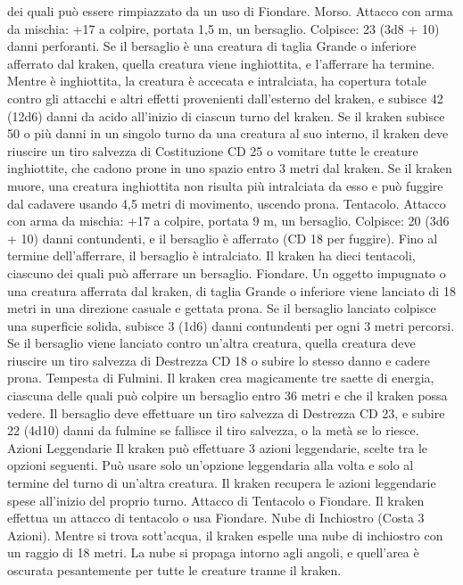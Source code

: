 \begin{multicols}{2}
dei quali può essere rimpiazzato da un uso di Fiondare.
Morso. Attacco con arma da mischia: +17 a colpire, portata 1,5
m, un bersaglio.
Colpisce: 23 (3d8 + 10) danni perforanti. Se il bersaglio è una
creatura di taglia Grande o inferiore afferrato dal kraken, quella
creatura viene inghiottita, e l’afferrare ha termine. Mentre è
inghiottita, la creatura è accecata e intralciata, ha copertura totale
contro gli attacchi e altri effetti provenienti dall’esterno del
kraken, e subisce 42 (12d6) danni da acido all’inizio di ciascun
turno del kraken.
Se il kraken subisce 50 o più danni in un singolo turno da una
creatura al suo interno, il kraken deve riuscire un tiro salvezza di
Costituzione CD 25 o vomitare tutte le creature inghiottite, che
cadono prone in uno spazio entro 3 metri dal kraken. Se il kraken
muore, una creatura inghiottita non risulta più intralciata da esso
e può fuggire dal cadavere usando 4,5 metri di movimento,
uscendo prona.
Tentacolo. Attacco con arma da mischia: +17 a colpire, portata 9
m, un bersaglio.
Colpisce: 20 (3d6 + 10) danni contundenti, e il bersaglio è
afferrato (CD 18 per fuggire). Fino al termine dell’afferrare, il
bersaglio è intralciato. Il kraken ha dieci tentacoli, ciascuno dei
quali può afferrare un bersaglio.
Fiondare. Un oggetto impugnato o una creatura afferrata dal
kraken, di taglia Grande o inferiore viene lanciato di 18 metri in
una direzione casuale e gettata prona. Se il bersaglio lanciato
colpisce una superficie solida, subisce 3 (1d6) danni contundenti
per ogni 3 metri percorsi. Se il bersaglio viene lanciato contro
un’altra creatura, quella creatura deve riuscire un tiro salvezza di
Destrezza CD 18 o subire lo stesso danno e cadere prona.
Tempesta di Fulmini. Il kraken crea magicamente tre saette di
energia, ciascuna delle quali può colpire un bersaglio entro 36
metri e che il kraken possa vedere. Il bersaglio deve effettuare un
tiro salvezza di Destrezza CD 23, e subire 22 (4d10) danni da
fulmine se fallisce il tiro salvezza, o la metà se lo riesce.
Azioni Leggendarie
Il kraken può effettuare 3 azioni leggendarie, scelte tra le opzioni
seguenti. Può usare solo un’opzione leggendaria alla volta e solo
al termine del turno di un’altra creatura. Il kraken recupera le
azioni leggendarie spese all’inizio del proprio turno.
Attacco di Tentacolo o Fiondare. Il kraken effettua un attacco
di tentacolo o usa Fiondare.
Nube di Inchiostro (Costa 3 Azioni). Mentre si trova
sott’acqua, il kraken espelle una nube di inchiostro con un raggio
di 18 metri. La nube si propaga intorno agli angoli, e quell’area è
oscurata pesantemente per tutte le creature tranne il kraken.

\end{multicols}
